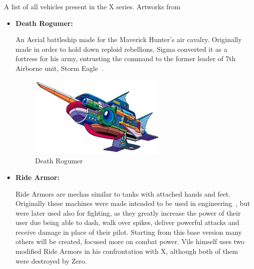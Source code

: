 \renewcommand{\portraitsize}{4cm}
A list of all vehicles present in the X series. Artworks from~\cite{book:MMX_Complete_art}
\begin{itemize}
	\item \hypertarget{vehicle:Death_Rogumer}{\textbf{Death Rogumer:}}
	An Aerial battleship made for the Maverick Hunter's air cavalry. Originally made in order to hold down reploid rebellions, Sigma converted it as a fortress 
	for his army, entrusting the command to the former leader of 7th Airborne unit, Storm Eagle~\cite{wayback:X_resources}.
	\begin{figure}[htp]
		\centering
		\includegraphics[height=\portraitsize]{figures/X1/Storm_eagle/DeathRogumer.jpg}
		\caption{Death Rogumer}
	\end{figure}
	\item \hypertarget{vehicle:Ride_Armor}{\textbf{Ride Armor:}}
	Ride Armors are mechas similar to tanks with attached hands and feet. Originally these machines were made intended to be used in engineering~\cite{wayback:X_resources}, but were later used also for fighting, as they greatly increase the power of their user due being able to dash, walk over spikes, deliver powerful attacks and receive damage in place of 
	their pilot. Starting from this base version many others will be created, focused more on combat power. Vile himself uses two modified Ride Armors in his confrontation with X, although both of them were destroyed by Zero.
	\begin{figure}[htp]
		\centering

\end{figure}
\end{itemize}
